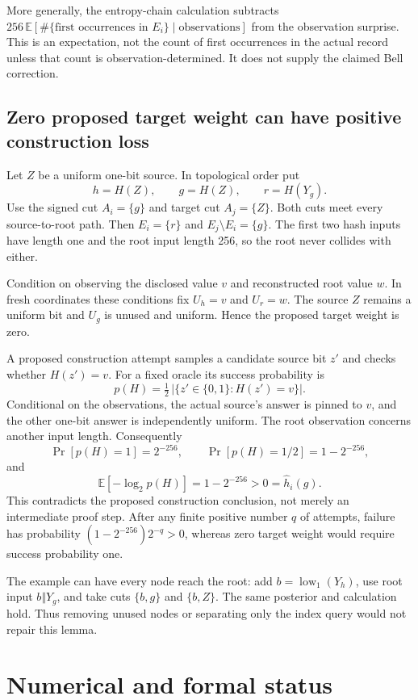 \documentclass[10pt]{article}
\begin{document}
More generally, the entropy-chain calculation subtracts
$256\,\mathbb E[\#\{\text{first occurrences in }E_i\}\mid\text{observations}]$ from the observation surprise. This is an expectation, not the count of first occurrences in the actual record unless that count is observation-determined. It does not supply the claimed Bell correction.

\subsection{Zero proposed target weight can have positive construction loss}

Let $Z$ be a uniform one-bit source. In topological order put
\[
h=H(Z),\qquad g=H(Z),\qquad r=H(Y_g).
\]
Use the signed cut $A_i=\{g\}$ and target cut $A_j=\{Z\}$. Both cuts meet every source-to-root path. Then $E_i=\{r\}$ and $E_j\setminus E_i=\{g\}$. The first two hash inputs have length one and the root input length 256, so the root never collides with either.

Condition on observing the disclosed value $v$ and reconstructed root value $w$. In fresh coordinates these conditions fix $U_h=v$ and $U_r=w$. The source $Z$ remains a uniform bit and $U_g$ is unused and uniform. Hence the proposed target weight is zero.

A proposed construction attempt samples a candidate source bit $z'$ and checks whether $H(z')=v$. For a fixed oracle its success probability is
\[
p(H)=\tfrac12\,|\{z'\in\{0,1\}:H(z')=v\}|.
\]
Conditional on the observations, the actual source's answer is pinned to $v$, and the other one-bit answer is independently uniform. The root observation concerns another input length. Consequently
\[
\Pr[p(H)=1]=2^{-256},\qquad
\Pr[p(H)=1/2]=1-2^{-256},
\]
and
\[
\mathbb E[-\log_2 p(H)]=1-2^{-256}>0=\widehat h_i(g).
\]
This contradicts the proposed construction conclusion, not merely an intermediate proof step. After any finite positive number $q$ of attempts, failure has probability $(1-2^{-256})2^{-q}>0$, whereas zero target weight would require success probability one.

The example can have every node reach the root: add $b=\operatorname{low}_1(Y_h)$, use root input $b\Vert Y_g$, and take cuts $\{b,g\}$ and $\{b,Z\}$. The same posterior and calculation hold. Thus removing unused nodes or separating only the index query would not repair this lemma.

\section{Numerical and formal status}\label{sec:numerical}
\end{document}
